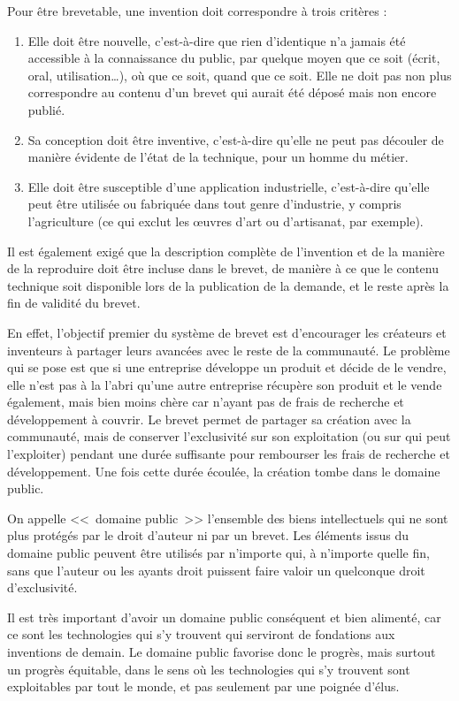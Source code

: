 Pour être brevetable, une invention doit correspondre à trois critères :
\begin{enumerate}
\item Elle doit être nouvelle, c'est-à-dire que rien d'identique n'a jamais été accessible à la connaissance du public, par quelque moyen que ce soit (écrit, oral, utilisation\dots{}), où que ce soit, quand que ce soit. Elle ne doit pas non plus correspondre au contenu d'un brevet qui aurait été déposé mais non encore publié.
\item Sa conception doit être inventive, c'est-à-dire qu'elle ne peut pas découler de manière évidente de l'état de la technique, pour un homme du métier.
\item Elle doit être susceptible d'une application industrielle, c'est-à-dire qu'elle peut être utilisée ou fabriquée dans tout genre d'industrie, y compris l'agriculture (ce qui exclut les œuvres d'art ou d'artisanat, par exemple).
\end{enumerate}\bigskip

Il est également exigé que la description complète de l'invention et de la manière de la reproduire doit être incluse dans le brevet, de manière à ce que le contenu technique soit disponible lors de la publication de la demande, et le reste après la fin de validité du brevet.

En effet, l'objectif premier du système de brevet est d'encourager les créateurs et inventeurs à partager leurs avancées avec le reste de la communauté.
Le problème qui se pose est que si une entreprise développe un produit et décide de le vendre, elle n'est pas à la l'abri qu'une autre entreprise récupère son produit et le vende également, mais bien moins chère car n'ayant pas de frais de recherche et développement à couvrir.
Le brevet permet de partager sa création avec la communauté, mais de conserver l'exclusivité sur son exploitation (ou sur qui peut l'exploiter) pendant une durée suffisante pour rembourser les frais de recherche et développement.
Une fois cette durée écoulée, la création tombe dans le domaine public.

On appelle <<~domaine public~>> l'ensemble des biens intellectuels qui ne sont plus protégés par le droit d'auteur ni par un brevet.
Les éléments issus du domaine public peuvent être utilisés par n'importe qui, à n'importe quelle fin, sans que l'auteur ou les ayants droit puissent faire valoir un quelconque droit d'exclusivité.

Il est très important d'avoir un domaine public conséquent et bien alimenté, car ce sont les technologies qui s'y trouvent qui serviront de fondations aux inventions de demain.
Le domaine public favorise donc le progrès, mais surtout un progrès équitable, dans le sens où les technologies qui s'y trouvent sont exploitables par tout le monde, et pas seulement par une poignée d'élus.

